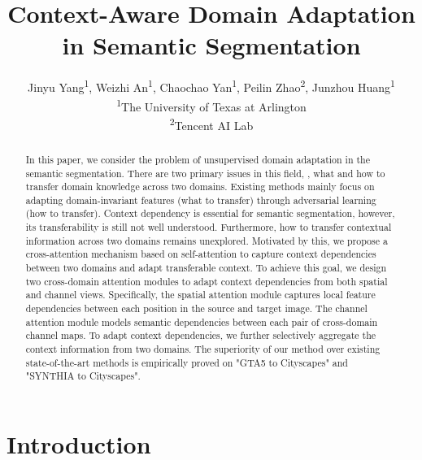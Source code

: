 \documentclass[10pt,twocolumn,letterpaper]{article}
\begin{document}
\title{Context-Aware Domain Adaptation in Semantic Segmentation}
	\author{Jinyu Yang\textsuperscript{1}, Weizhi An\textsuperscript{1}, Chaochao Yan\textsuperscript{1}, Peilin Zhao\textsuperscript{2}, Junzhou Huang\textsuperscript{1}\\
		\textsuperscript{1}The University of Texas at Arlington\\
		\textsuperscript{2}Tencent AI Lab\\
}

	\maketitle


\begin{abstract}
		In this paper, we consider the problem of unsupervised domain adaptation in the semantic segmentation. There are two primary issues in this field, \ie, what and how to transfer domain knowledge across two domains. Existing methods mainly focus on adapting domain-invariant features (what to transfer) through adversarial learning (how to transfer). Context dependency is essential for semantic segmentation, however, its transferability is still not well understood. Furthermore, how to transfer contextual information across two domains remains unexplored. Motivated by this, we propose a cross-attention mechanism based on self-attention to capture context dependencies between two domains and adapt transferable context. To achieve this goal, we design two cross-domain attention modules to adapt context dependencies from both spatial and channel views. Specifically, the spatial attention module captures local feature dependencies between each position in the source and target image. The channel attention module models semantic dependencies between each pair of cross-domain channel maps. To adapt context dependencies, we further selectively aggregate the context information from two domains. The superiority of our method over existing state-of-the-art methods is empirically proved on "GTA5 to Cityscapes" and "SYNTHIA to Cityscapes".

	\end{abstract}


\section{Introduction}
\end{document}
